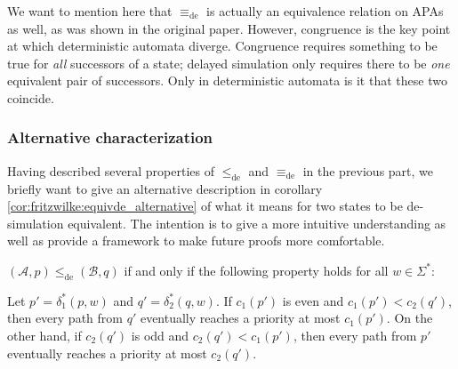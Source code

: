 We want to mention here that $\equiv_\text{de}$ is actually an equivalence relation on APAs as well, as was shown in the original paper. However, congruence is the key point at which deterministic automata diverge. Congruence requires something to be true for \emph{all} successors of a state; delayed simulation only requires there to be \emph{one} equivalent pair of successors. Only in deterministic automata is it that these two coincide.




\vspace{1cm}
\subsubsection*{Alternative characterization}
Having described several properties of $\leq_\text{de}$ and $\equiv_\text{de}$ in the previous part, we briefly want to give an alternative description in corollary \ref{cor:fritzwilke:equivde_alternative} of what it means for two states to be de-simulation equivalent. The intention is to give a more intuitive understanding as well as provide a framework to make future proofs more comfortable.

\begin{lem}
\label{lem:fritzwilke:preceq_alternative}
	$(\mathcal{A}, p) \leq_\text{de} (\mathcal{B}, q)$ if and only if the following property holds for all $w \in \Sigma^*$: 
	
	Let $p' = \delta_1^*(p, w)$ and $q' = \delta_2^*(q, w)$. If $c_1(p')$ is even and $c_1(p') < c_2(q')$, then every path from $q'$ eventually reaches a priority at most $c_1(p')$. On the other hand, if $c_2(q')$ is odd and $c_2(q') < c_1(p')$, then every path from $p'$ eventually reaches a priority at most $c_2(q')$.
\end{lem}

